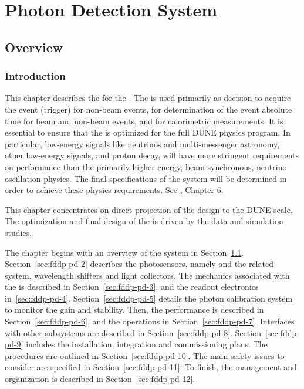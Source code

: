 \chapter{Photon Detection System}
\label{ch:fddp-pd}

\section{Overview}
\label{sec:fddp-pd-1}

\subsection{Introduction}
\label{sec:fddp-pd-1.1}

This chapter describes the  for the . The  is used primarily as decision to acquire the event (trigger) for non-beam events, for determination of the event absolute time for beam and non-beam events, and for calorimetric measurements. It is essential to ensure that the \dual {} is optimized for the full DUNE physics program. In particular, low-energy signals like  neutrinos and multi-messenger astronomy, other low-energy signals, and proton decay, will have more stringent requirements on  performance than the primarily higher energy, beam-synchronous, neutrino oscillation physics. The final specifications of the system will be determined in order to achieve these physics requirements. See \voltitlespfd{}, Chapter 6.

This %
 chapter concentrates on direct projection of the  design to the DUNE scale. The optimization and final design of the \dual {} is driven by the  \cite{protoDUNDP-tdr} data and simulation studies.

The chapter begins with an overview of the system in Section~\ref{sec:fddp-pd-1}. Section~\ref{sec:fddp-pd-2} describes the photosensors, namely  %
and the related  system, wavelength shifters and light collectors. The mechanics associated with the  is described in Section~\ref{sec:fddp-pd-3}, and the readout electronics in~\ref{sec:fddp-pd-4}. Section~\ref{sec:fddp-pd-5} details the photon calibration system to monitor the  gain and stability. Then, the  performance is described in Section~\ref{sec:fddp-pd-6}, and the operations in Section~\ref{sec:fddp-pd-7}. Interfaces with other subsystems are described in Section~\ref{sec:fddp-pd-8}. Section~\ref{sec:fddp-pd-9} includes the installation, integration and commissioning plans. The  procedures are outlined in Section~\ref{sec:fddp-pd-10}. The main safety issues to consider are specified in Section~\ref{sec:fddp-pd-11}. To finish, the management and organization is described in Section~\ref{sec:fddp-pd-12}.

